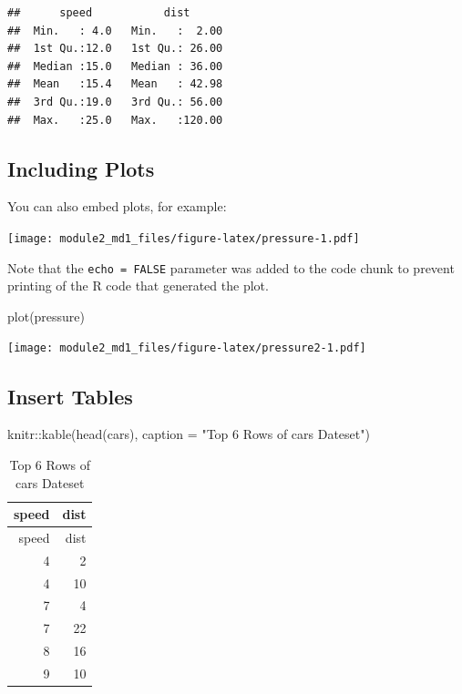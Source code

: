 \documentclass[
]{article}
\newenvironment{Shaded}{\begin{snugshade}}{\end{snugshade}}
\newcommand{\AttributeTok}[1]{\textcolor[rgb]{0.77,0.63,0.00}{#1}}
\newcommand{\FunctionTok}[1]{\textcolor[rgb]{0.00,0.00,0.00}{#1}}
\newcommand{\NormalTok}[1]{#1}
\newcommand{\SpecialCharTok}[1]{\textcolor[rgb]{0.00,0.00,0.00}{#1}}
\newcommand{\StringTok}[1]{\textcolor[rgb]{0.31,0.60,0.02}{#1}}
\begin{document}
\begin{verbatim}
##      speed           dist       
##  Min.   : 4.0   Min.   :  2.00  
##  1st Qu.:12.0   1st Qu.: 26.00  
##  Median :15.0   Median : 36.00  
##  Mean   :15.4   Mean   : 42.98  
##  3rd Qu.:19.0   3rd Qu.: 56.00  
##  Max.   :25.0   Max.   :120.00
\end{verbatim}

\hypertarget{including-plots}{%
\subsection{Including Plots}\label{including-plots}}

You can also embed plots, for example:

\texttt{[image: module2\_md1\_files/figure-latex/pressure-1.pdf]}

Note that the \texttt{echo\ =\ FALSE} parameter was added to the code
chunk to prevent printing of the R code that generated the plot.

\begin{Shaded}
\begin{Highlighting}[]
\FunctionTok{plot}\NormalTok{(pressure)}
\end{Highlighting}
\end{Shaded}

\texttt{[image: module2\_md1\_files/figure-latex/pressure2-1.pdf]}

\hypertarget{insert-tables}{%
\subsection{Insert Tables}\label{insert-tables}}

\begin{Shaded}
\begin{Highlighting}[]
\NormalTok{knitr}\SpecialCharTok{::}\FunctionTok{kable}\NormalTok{(}\FunctionTok{head}\NormalTok{(cars),}
             \AttributeTok{caption =} \StringTok{"Top 6 Rows of cars Dateset"}\NormalTok{)}
\end{Highlighting}
\end{Shaded}

\begin{longtable}[]{@{}rr@{}}
\caption{Top 6 Rows of cars Dateset}\tabularnewline
\toprule
speed & dist \\
\midrule
\endfirsthead
\toprule
speed & dist \\
\midrule
\endhead
4 & 2 \\
4 & 10 \\
7 & 4 \\
7 & 22 \\
8 & 16 \\
9 & 10 \\
\bottomrule
\end{longtable}
\end{document}
